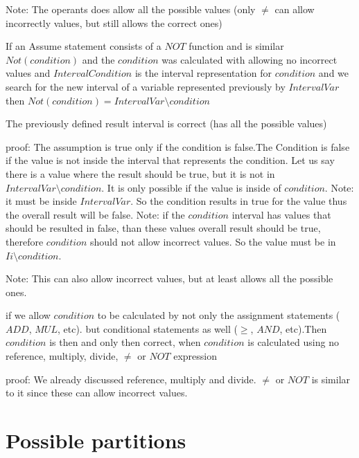 Note: The operants does allow all the possible values (only $\neq$ can allow incorrectly values, but still allows the correct ones)

\begin{definition}
	If an Assume statement consists of a $NOT$ function and is similar $Not(condition)$ and the $condition$ was calculated with allowing no incorrect values and $IntervalCondition$ is the interval representation for $condition$ and we search for the new interval of a variable represented previously by $IntervalVar$ then $Not(condition)=IntervalVar \setminus condition$
\end{definition} 

\begin{theorem}
	The previously defined result interval is correct (has all the possible values)
\end{theorem}
{proof: } The assumption is true only if the condition is false.The Condition is false if the value is not inside the interval that represents the condition. Let us say there is a value where the result should be true, but it is not in $IntervalVar \setminus condition$. It is only possible if the value is inside of $condition$. Note: it must be inside $IntervalVar$. So the condition results in true for the value thus the overall result will be false. Note: if the $condition$ interval has values that should be resulted in false, than these values overall result should be true, therefore $condition$ should not allow incorrect values. So the value must be in $Ii \setminus condition$.

Note: This can also allow incorrect values, but at least allows all the possible ones.

\begin{theorem}
	if we allow $condition$ to be calculated by not only the assignment statements ($ADD$, $MUL$, etc). but conditional statements as well ($\geq$, $AND$, etc).Then $condition$ is then and only then correct, when $condition$ is calculated using no reference, multiply, divide, $\neq$ or $NOT$ expression
\end{theorem}
{proof: } We already discussed reference, multiply and divide. $\neq$ or $NOT$ is similar to it since these can allow incorrect values.

\section{Possible partitions}

